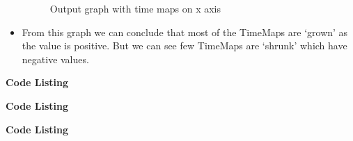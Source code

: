 \begin{itemize}
\begin{figure}[h!]
\begin{center}
\caption{Output graph with time maps on x axis}
\label{fig:q3fig1}
\end{center}
\end{figure}
\item From this graph we can conclude that most of the TimeMaps are `grown' as the value is positive. But we can see few TimeMaps are `shrunk' which have negative values.
\end{itemize}

\newpage
\textbf{Code Listing}
\sloppy



\textbf{Code Listing}
\sloppy


\newpage
\textbf{Code Listing}
\sloppy

